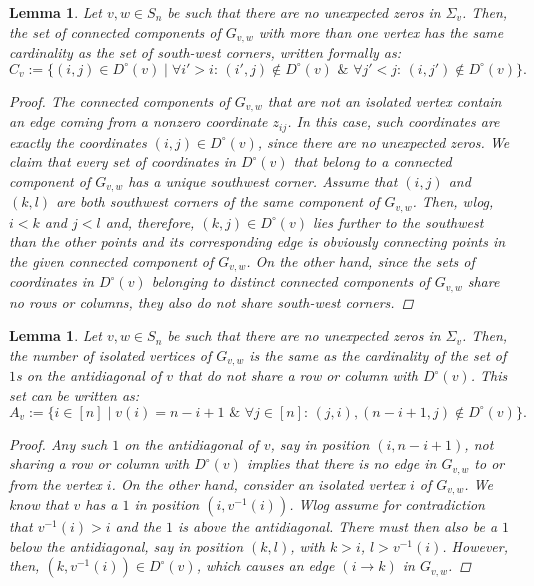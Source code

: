 \documentclass[11pt]{amsart}
\newtheorem{lemma}[theorem]{Lemma}
\theoremstyle{definition}
\theoremstyle{definition}
\theoremstyle{definition}
\theoremstyle{definition}
\newcommand{\Gvwt}{G_{v,w}}
\newcommand{\Dc}{D^{\circ}}
\begin{document}
\begin{lemma}\label{lem: connected components for no unexpected zeros}
    Let $v,w \in S_n$ be such that there are no unexpected zeros in  $\Sigma_v$.
    Then, the set of connected components of $\Gvwt$ with more than one vertex has the same cardinality as the set of south-west corners, written formally as:
    $$C_v := \{ (i,j)\in \Dc(v) \mid \forall i'>i: \, (i',j) \not\in \Dc(v) \,\, \& \,\, \forall j'<j: \, (i,j') \not\in \Dc(v) \} .$$
    \begin{proof}
    The connected components of $\Gvwt$ that are not an isolated vertex contain an edge coming from a nonzero coordinate $z_{ij}$. In this case, such coordinates are exactly the coordinates $(i,j) \in \Dc(v)$, since there are no unexpected zeros.
    We claim that every set of coordinates in $\Dc(v)$ that belong to a connected component of $\Gvwt$ has a unique southwest corner. Assume that $(i,j)$ and $(k,l)$ are both southwest corners of the same component of $\Gvwt$. Then, wlog, $i <k$ and $j <l$ and, therefore, $(k,j) \in \Dc(v)$ lies further to the southwest than the other points and its corresponding edge is obviously connecting points in the given connected component of $\Gvwt$. 
    On the other hand, since the sets of coordinates in $\Dc(v)$ belonging to distinct connected components of $\Gvwt$ share no rows or columns, they also do not share south-west corners.
    \end{proof}
\end{lemma}

\begin{lemma}\label{lem: isolated vertices for no unexpected zeros}
    Let $v,w \in S_n$ be such that there are no unexpected zeros in  $\Sigma_v$. Then, the number of isolated vertices of $\Gvwt$ is the same as the cardinality of the set of $1$s on the antidiagonal of $v$ that do not share a row or column with $\Dc(v)$. This set can be written as:
    $$A_v := \{ i \in [n] \mid v(i) = n-i+1 \,\, \& \,\, \forall j \in [n]: \, (j,i), (n-i+1,j) \not\in \Dc(v)\}.$$
    \begin{proof}
        Any such $1$ on the antidiagonal of $v$, say in position $(i,n-i+1)$, not sharing a row or column with $\Dc(v)$ implies that there is no edge in $\Gvwt$ to or from the vertex $i$.
        On the other hand, consider an isolated vertex $i$ of $\Gvwt$. 
        We know that $v$ has a $1$ in position $(i,v^{-1}(i))$. Wlog assume for contradiction that $v^{-1}(i) >i$ and the $1$ is above the antidiagonal. There must then also be a $1$ below the antidiagonal, say in position $(k,l)$, with $k>i$, $l> v^{-1}(i)$. However, then, $(k,v^{-1}(i)) \in \Dc(v)$, which causes an edge $(i \rightarrow k)$ in $\Gvwt$.
    \end{proof}
\end{lemma}
\end{document}

